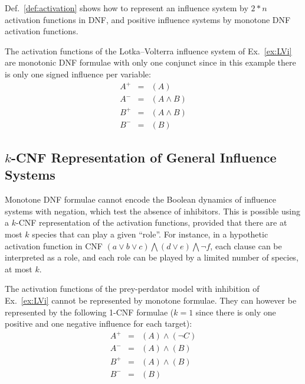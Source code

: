 \documentclass{llncs}
\begin{document}
Def.~\ref{def:activation} shows how to represent an influence system by $2*n$ activation functions in DNF, 
and positive influence systems by monotone DNF activation functions.

\begin{example}
The activation functions of the Lotka--Volterra influence system of Ex.~\ref{ex:LVi}
are monotonic DNF formulae with only one conjunct since in this example there is only one signed influence per variable:
\begin{eqnarray*}
   A^+&=&(A)\\
   A^-&=&(A \wedge B)\\
   B^+&=&(A\wedge B)\\
   B^-&=&(B)
\end{eqnarray*}

\end{example}


\subsection{$k$-CNF Representation of General Influence Systems}

Monotone DNF formulae cannot encode the Boolean dynamics of influence systems with negation, which test the absence of inhibitors.
This is possible using a $k$-CNF representation of the activation functions, 
provided that there are at most $k$ species that can play a given ``role''. 
For instance, in a hypothetic activation function in CNF
$
\left(a \vee b \vee c\right) \bigwedge
\left(d \vee e\right) \bigwedge 
\neg f
$,
each clause can be interpreted as a role, and each role can be played by a limited number of species, at most $k$.


\begin{example}
   The activation functions of the prey-perdator model with inhibition of Ex.~\ref{ex:LVi} cannot be
   represented by monotone formulae. They can however be represented by the following 1-CNF
   formulae ($k=1$ since there is only one positive and one
   negative influence for each target):
\begin{eqnarray*}
   A^+&=&(A)\wedge(\neg C)\\
A^-&=&(A) \wedge (B)\\
B^+&=&(A)\wedge (B)\\
   B^-&=&(B)
\end{eqnarray*}

\end{example}
\end{document}
